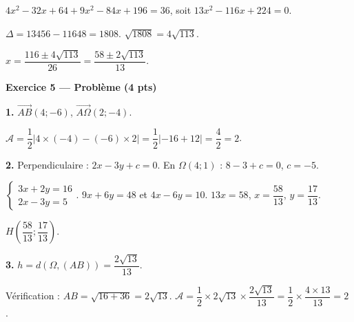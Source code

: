 $4x^2 - 32x + 64 + 9x^2 - 84x + 196 = 36$, soit $13x^2 - 116x + 224 = 0$.

$\Delta = 13456 - 11648 = 1808$. $\sqrt{1808} = 4\sqrt{113}$.

$x = \dfrac{116 \pm 4\sqrt{113}}{26} = \dfrac{58 \pm 2\sqrt{113}}{13}$.

\bigskip

\textbf{Exercice 5 — Problème (4 pts)}


\textbf{1.} $\vec{AB}(4 ; -6)$, $\vec{A\Omega}(2 ; -4)$.

$\mathcal{A} = \dfrac{1}{2}|4 \times (-4) - (-6) \times 2| = \dfrac{1}{2}|-16 + 12| = \dfrac{4}{2} = 2$.

\textbf{2.} Perpendiculaire : $2x - 3y + c = 0$. En $\Omega(4;1)$ : $8 - 3 + c = 0$, $c = -5$.

$\begin{cases} 3x + 2y = 16 \\ 2x - 3y = 5 \end{cases}$. $9x + 6y = 48$ et $4x - 6y = 10$. $13x = 58$, $x = \dfrac{58}{13}$, $y = \dfrac{17}{13}$.

$H\!\left(\dfrac{58}{13} ; \dfrac{17}{13}\right)$.

\textbf{3.} $h = d(\Omega, (AB)) = \dfrac{2\sqrt{13}}{13}$.

Vérification : $AB = \sqrt{16+36} = 2\sqrt{13}$. $\mathcal{A} = \dfrac{1}{2} \times 2\sqrt{13} \times \dfrac{2\sqrt{13}}{13} = \dfrac{1}{2} \times \dfrac{4 \times 13}{13} = 2$ \checkmark.
